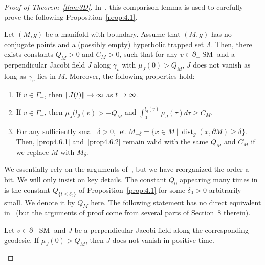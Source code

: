 \documentclass[AHL,Unicode,longabstracts,published]{cedram}
\DeclareMathOperator{\dist}{dist}
\DeclareMathOperator{\SM}{SM}
\theoremstyle{plain}
\renewcommand*{\to}{\mathchoice{\longrightarrow}{\rightarrow}{\rightarrow}{\rightarrow}}
\begin{document}
\begin{proof}[Proof of Theorem~\ref{thm:3D}]
In~\cite[Section~4]{Chen-Erchenko-Gogolev}, this comparison lemma is used to carefully prove the following Proposition~\ref{prop:4.1}.

\begin{prop}
\label{prop:4.1}
Let $(M, g)$ be a manifold with boundary. Assume that $(M, g)$ has no conjugate points and a (possibly empty) hyperbolic trapped set $\Lambda$. Then, there exists constants $Q_M > 0$ and $C_M > 0$, such that for any $v \in \partial_- \SM$ and a perpendicular Jacobi field $J$ along $\gamma_v$ with $\mu_J (0) > Q_M$, $J$ does not vanish as long as $\gamma_v$ lies in $M$. Moreover, the following properties hold:
\begin{enumerate}
\item\label{prop4.6.1} If $v \in \Gamma_-$, then $\| J(t)\|\to \infty$ as $t\to\infty$.
\item\label{prop4.6.2} If $v\in \Gamma_-$, then $\mu_J(l_g(v)>-Q_M$ and $\int_0^{l_g(v)} \mu_J(\tau)d\tau \geq C_M$.
\item\label{prop4.6.3} For any sufficiently small $\delta>0$, let $M_{-\delta}=\{x\in M\ |\ \dist_g(x,\partial M)\geq \delta\}$. Then, \eqref{prop4.6.1} and~\eqref{prop4.6.2} remain valid with the same $Q_M$ and $C_M$ if we replace $M$ with $M_\delta$.
\end{enumerate}
\end{prop}

We essentially rely on the arguments of~\cite[Section~8]{Chen-Erchenko-Gogolev}, but we have reorganized the order a bit. We will only insist on key details. The constant $Q_0$ appearing many times in~\cite[Section~8]{Chen-Erchenko-Gogolev} is the constant $Q_{\{t\leq \delta_0\}}$ of Proposition~\ref{prop:4.1} for some $\delta_0>0$ arbitrarily small. We denote it by $Q_M$ here. The following statement has no direct equivalent in~\cite{Chen-Erchenko-Gogolev} (but the arguments of proof come from several parts of Section~8 therein).

\begin{lemm}\label{lemma:our-lemma}
Let $v\in \partial_- \SM$ and $J$ be a perpendicular Jacobi field along the corresponding geodesic. If $\mu_J(0)>Q_M$, then $J$ does not vanish in positive time.
\end{lemm}



\end{proof}
\end{document}
